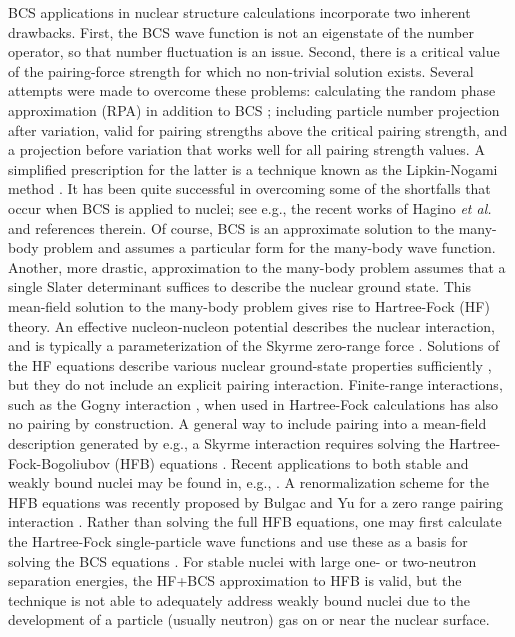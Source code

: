 \documentclass[rmp,preprint,aps,floatfix]{revtex4}
\begin{document}
BCS applications in nuclear structure calculations 
incorporate two inherent drawbacks. First, the BCS
wave function is not an eigenstate of the number operator, so that number
fluctuation is an issue. Second, there is a critical value
of the pairing-force strength for which no non-trivial solution exists. 
Several attempts were made to overcome these problems:
calculating the random phase approximation (RPA) in addition 
to BCS \cite{uw}; including particle number projection \cite{klm} 
after variation, valid 
for pairing strengths above the critical pairing strength, 
and a projection before variation that works well for all pairing strength 
values. A simplified prescription for the latter 
is a technique known as the Lipkin-Nogami method 
\cite{lipkin,nogami}. It has been quite successful in overcoming 
some of the shortfalls that
occur when BCS is applied to nuclei; see e.g., the recent works of Hagino 
{\em et al.}  \cite{hagino2000,hagino2002} and references therein. 
Of course, BCS is an approximate solution to the many-body problem
and assumes a particular form for the many-body wave function. Another,
more drastic, approximation to the many-body problem 
assumes that a single Slater determinant
suffices to describe the nuclear ground state. This mean-field 
solution to the many-body problem gives rise to 
Hartree-Fock (HF) theory. An effective nucleon-nucleon 
potential describes the nuclear interaction, and is
typically a 
parameterization of the Skyrme zero-range force \cite{sk_56,sk_59,vb_70,vb_72}.
Solutions of the HF equations 
describe various nuclear ground-state properties sufficiently \cite{qf_78}, 
but they do not include an explicit pairing interaction. 
Finite-range interactions, such as
the Gogny interaction \cite{dgg_75}, when used in Hartree-Fock calculations
has also no pairing by construction. 
A general way to include pairing into a mean-field 
description generated by e.g., a Skyrme interaction requires solving the 
Hartree-Fock-Bogoliubov (HFB) equations \cite{bog_58}. Recent
applications to both stable and weakly bound nuclei
may be found in, e.g., \cite{dob_96,heenen_2002b,heenen_2002a}. 
A renormalization scheme for the HFB equations 
was recently proposed by Bulgac and Yu for a zero range pairing interaction
\cite{aurel2001a,aurel2001b}.  
Rather than solving the full HFB equations, one may first
calculate the Hartree-Fock single-particle wave functions and
use these as a basis for solving the BCS equations \cite{tondeur_79,
nayak_95}.  
For stable nuclei with large one- or two-neutron 
separation energies, the HF+BCS approximation to HFB is valid, but
the technique is not able to adequately address weakly bound nuclei
due to the development of a particle (usually neutron) gas on or
near the nuclear surface. 
\end{document}
